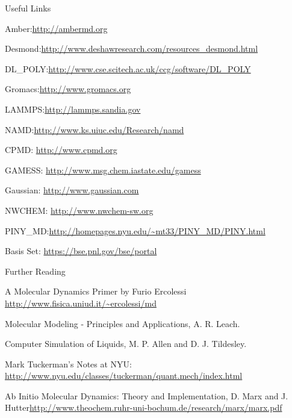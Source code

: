 \documentclass[slidestop,mathserif,compress,xcolor=svgnames]{beamer}
\begin{document}
\begin{frame}[allowframebreaks]
\begin{block}{Useful Links}
\begin{itemize}
{\footnotesize\color{Blue}
\item{\color{tigerspurple}Amber:}\url{http://ambermd.org}
\item{\color{tigerspurple}Desmond:}\url{http://www.deshawresearch.com/resources_desmond.html}
\item{\color{tigerspurple}DL\_POLY:}\url{http://www.cse.scitech.ac.uk/ccg/software/DL_POLY}
\item{\color{tigerspurple}Gromacs:}\url{http://www.gromacs.org}
\item{\color{tigerspurple}LAMMPS:}\url{http://lammps.sandia.gov}
\item{\color{tigerspurple}NAMD:}\url{http://www.ks.uiuc.edu/Research/namd}
\item {\color{tigerspurple}CPMD:} \url{http://www.cpmd.org}
\item {\color{tigerspurple}GAMESS:} \url{http://www.msg.chem.iastate.edu/gamess}
\item {\color{tigerspurple}Gaussian:} \url{http://www.gaussian.com}
\item {\color{tigerspurple}NWCHEM:} \url{http://www.nwchem-sw.org}
\item{\color{tigerspurple}PINY\_MD:}\url{http://homepages.nyu.edu/~mt33/PINY_MD/PINY.html}
\item {\color{tigerspurple}Basis Set:} \url{https://bse.pnl.gov/bse/portal}
}
\end{itemize}
\end{block}
\begin{block}{\small Further Reading}
\begin{itemize}
{\scriptsize
\item A Molecular Dynamics Primer by Furio Ercolessi {\color{Blue}\url{http://www.fisica.uniud.it/~ercolessi/md}}
\item Molecular Modeling - Principles and Applications, A. R. Leach.
\item Computer Simulation of Liquids, M. P. Allen and D. J. Tildesley.
\item Mark Tuckerman's Notes at NYU: {\color{Blue}\url{http://www.nyu.edu/classes/tuckerman/quant.mech/index.html}}
\item Ab Initio Molecular Dynamics: Theory and Implementation, D. Marx and J. Hutter{\color{Blue}\url{http://www.theochem.ruhr-uni-bochum.de/research/marx/marx.pdf}}
}
\end{itemize}
\end{block}
\end{frame}
\end{document}
